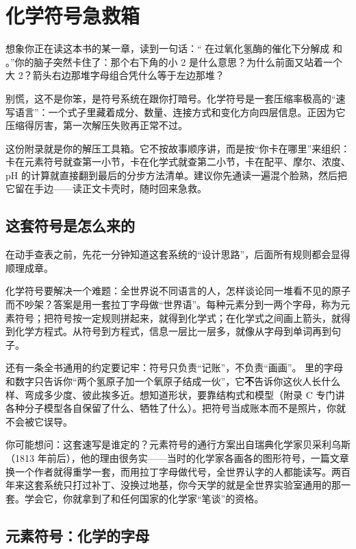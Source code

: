 \chapter{化学符号急救箱}

\begin{kaichang}
想象你正在读这本书的某一章，读到一句话：“ 在过氧化氢酶的催化下分解成  和 。”你的脑子突然卡住了：那个右下角的小 2 是什么意思？为什么前面又站着一个大 2？箭头右边那堆字母组合凭什么等于左边那堆？

别慌，这不是你笨，是符号系统在跟你打暗号。化学符号是一套压缩率极高的“速写语言”：一个式子里藏着成分、数量、连接方式和变化方向四层信息。正因为它压缩得厉害，第一次解压失败再正常不过。

这份附录就是你的解压工具箱。它不按故事顺序讲，而是按“你卡在哪里”来组织：卡在元素符号就查第一小节，卡在化学式就查第二小节，卡在配平、摩尔、浓度、pH 的计算就直接翻到最后的分步方法清单。建议你先通读一遍混个脸熟，然后把它留在手边——读正文卡壳时，随时回来急救。
\end{kaichang}

\section{这套符号是怎么来的}

在动手查表之前，先花一分钟知道这套系统的“设计思路”，后面所有规则都会显得顺理成章。

化学符号要解决一个难题：全世界说不同语言的人，怎样谈论同一堆看不见的原子而不吵架？答案是用一套拉丁字母做“世界语”。每种元素分到一两个字母，称为元素符号；把符号按一定规则拼起来，就得到化学式；在化学式之间画上箭头，就得到化学方程式。从符号到方程式，信息一层比一层多，就像从字母到单词再到句子。

还有一条全书通用的约定要记牢：符号只负责“记账”，不负责“画画”。 里的字母和数字只告诉你“两个氢原子加一个氧原子结成一伙”，它\textbf{不}告诉你这伙人长什么样、弯成多少度、彼此挨多近。想知道形状，要靠结构式和模型（附录 C 专门讲各种分子模型各自保留了什么、牺牲了什么）。把符号当成账本而不是照片，你就不会被它误导。

你可能想问：这套速写是谁定的？元素符号的通行方案出自瑞典化学家贝采利乌斯（1813 年前后），他的理由很务实——当时的化学家各画各的图形符号，一篇文章换一个作者就得重学一套，而用拉丁字母做代号，全世界认字的人都能读写。两百年来这套系统只打过补丁、没换过地基，你今天学的就是全世界实验室通用的那一套。学会它，你就拿到了和任何国家的化学家“笔谈”的资格。

\section{元素符号：化学的字母}

